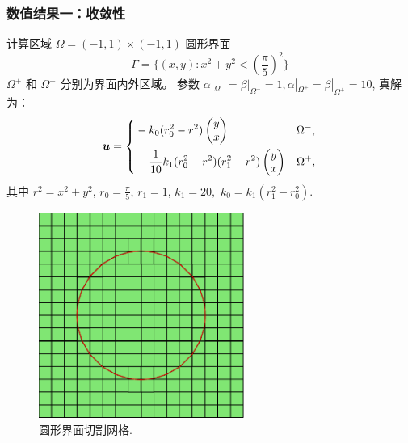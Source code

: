 \documentclass[notheorems,serif]{beamer}
\begin{document}
\begin{frame}
\frametitle{数值结果一：收敛性}
  \small
  \begin{minipage}[b]{0.6\linewidth}
    计算区域 $\Omega = (-1, 1)\times(-1, 1)$
    圆形界面 
    $$
    \Gamma = \{(x, y) : x^2+y^2 < \left(\frac{\pi}{5}\right)^2\}
    $$
    $\Omega^+$ 和 $\Omega^-$ 分别为界面内外区域。
    参数 $\alpha|_{\Omega^-} = \beta|_{\Omega^-} = 1, 
    \alpha|_{\Omega^+} = \beta|_{\Omega^+} = 10$, 真解为： 
    \small
    $$
    \boldsymbol{u} = \left\{
        \begin{aligned}
        & - k_0(r_0^2 - r^2)
        \begin{pmatrix}
        y\\
        x
        \end{pmatrix} \quad& \Omega^-, \\
        &-\frac{1}{10}
        k_1(r_0^2 - r^2)(r_1^2 - r^2)
        \begin{pmatrix}
        y\\
        x
        \end{pmatrix}& \Omega^+, \\
        \end{aligned} 
    \right.
    $$
    其中 $r^2 = x^2 + y^2$, $r_0 = \frac{\pi}{5}$, 
    $r_1 = 1$, $k_1 = 20,$ $k_0 = k_1(r_1^2-r_0^2).$
\end{minipage}
\hfill
\begin{minipage}[b]{0.38\linewidth}
    \centering
    \begin{figure}[htpb]
        \centering
        \includegraphics[width=0.6\textwidth]{../figures/maxwell/convergence_test.pdf}
        \caption{圆形界面切割网格.}
    \end{figure}
    \vspace{15pt}
\end{minipage}

\end{frame}
\end{document}
